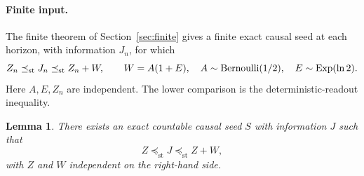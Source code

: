 \documentclass[11pt,a4paper]{article}
\newtheorem{lemma}[theorem]{Lemma}
\theoremstyle{definition}\newtheorem{definition}[theorem]{Definition}
\theoremstyle{remark}\newtheorem{remark}[theorem]{Remark}
\newcommand{\st}{\preceq_{\mathrm{st}}}
\numberwithin{equation}{section}
\begin{document}
\paragraph{Finite input.}
The finite theorem of Section~\ref{sec:finite} gives a finite exact causal seed
at each horizon, with information $J_n$, for which
\begin{equation}\label{ren:eq:finite}
 Z_n\st J_n\st Z_n+W,
 \qquad
 W=A(1+E),\quad A\sim{\rm Bernoulli}(1/2),\quad
 E\sim{\rm Exp}(\ln2).
\end{equation}
Here $A,E,Z_n$ are independent. The lower comparison is the deterministic-readout inequality.

\begin{lemma}\label{ren:lem:limit}
There exists an exact countable causal seed $S$ with information $J$ such that
\[
 \boxed{Z\st J\st Z+W,}
\]
with $Z$ and $W$ independent on the right-hand side.
\end{lemma}
\end{document}
